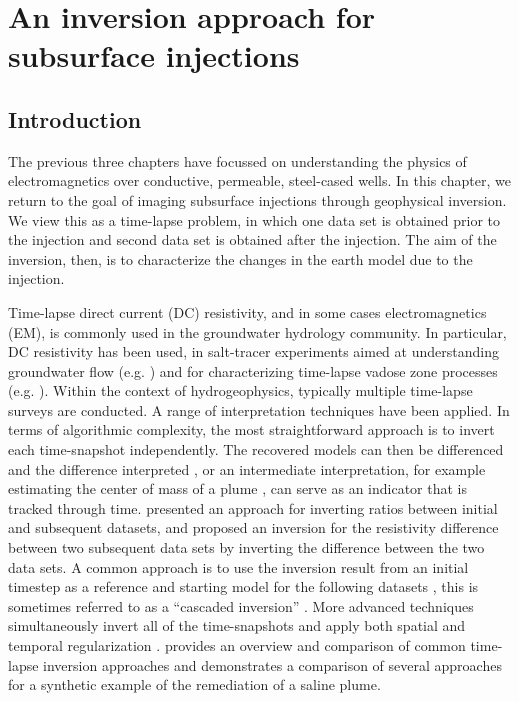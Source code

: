 

\chapter{An inversion approach for subsurface injections}
\label{ch:inversion}

\section{Introduction}
The previous three chapters have focussed on understanding the physics of electromagnetics over conductive, permeable, steel-cased wells. In this chapter, we return to the goal of imaging subsurface injections through geophysical inversion. We view this as a time-lapse problem, in which one data set is obtained prior to the injection and second data set is obtained after the injection. The aim of the inversion, then, is to characterize the changes in the earth model due to the injection.

Time-lapse direct current (DC) resistivity, and in some cases electromagnetics (EM), is commonly used in the groundwater hydrology community. In particular, DC resistivity has been used, in salt-tracer experiments aimed at understanding groundwater flow (e.g. \cite{Slater2002, Kemna2002, Singha2005, Doetsch2012}) and for characterizing time-lapse vadose zone processes (e.g. \cite{Daily1992, Park1998, Binley2002}). Within the context of hydrogeophysics, typically multiple time-lapse surveys are conducted. A range of interpretation techniques have been applied. In terms of algorithmic complexity, the most straightforward approach is to invert each time-snapshot independently. The recovered models can then be differenced and the difference interpreted \citep{Cassiani2006}, or an intermediate interpretation, for example estimating the center of mass of a plume \citep{Singha2006, Doetsch2012}, can serve as an indicator that is tracked through time. \cite{Daily1992} presented an approach for inverting ratios between initial and subsequent datasets, and \citep{LaBrecque2000} proposed an inversion for the resistivity difference between two subsequent data sets by inverting the difference between the two data sets. A common approach is to use the inversion result from an initial timestep as a reference and starting model for the following datasets \citep{Loke2001, Oldenborger2007}, this is sometimes referred to as a ``cascaded inversion'' \citep{Miller2008}. More advanced techniques simultaneously invert all of the time-snapshots and apply both spatial and temporal regularization \citep{Kim2009, Loke2014}. \cite{Hayley2011} provides an overview and comparison of common time-lapse inversion approaches and demonstrates a comparison of several approaches for a synthetic example of the remediation of a saline plume.

